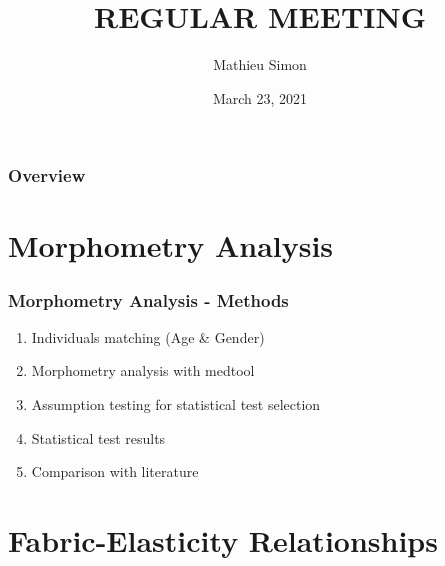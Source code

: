 \documentclass[xcolor=table]{beamer}
\title[Regular Meeting]{
\uppercase{Regular Meeting}
}
\author{Mathieu Simon}
\institute[University of Bern]
{
MSc - Biomedical Engineering \\
University of Bern, Faculty of Medicine \\
\medskip
}
\date{March 23, 2021}
\begin{document}
\begin{frame}
\titlepage
\end{frame}


\begin{frame}
	\frametitle{Overview}
	\tableofcontents
\end{frame}


\section{Morphometry Analysis}

\begin{frame}
	\frametitle{Morphometry Analysis - Methods}
	\begin{enumerate}
		\item Individuals matching (Age \& Gender)
		\item Morphometry analysis with medtool
		\item Assumption testing for statistical test selection
		\item Statistical test results
		\item Comparison with literature
	\end{enumerate}
\end{frame}



\section{Fabric-Elasticity Relationships}
\end{document}
